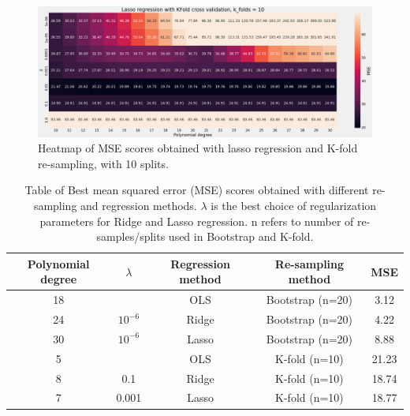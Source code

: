 \begin{figure}[H]
    \centering
    \includegraphics[width=\textwidth]{Figures/g_lasso_heatmap_kfold_n_10.png}
    \caption{Heatmap of MSE scores obtained with lasso regression and K-fold
    re-sampling, with 10 splits.}  
    \label{fig:g_lasso_boots_heatmap}  
\end{figure}



\begin{table}
    \centering
    \caption{Table of Best mean squared error (MSE) scores obtained with
        different re-sampling and regression
        methods. $\lambda $ is the best choice of regularization parameters for
        Ridge and Lasso regression. n refers to number of re-samples/splits used in
        Bootstrap and K-fold.}  
    \label{tab:terrain_mse_best} 
    \begin{tabular}{|c|c|c|c|c|}
        \hline
        Polynomial degree & $\lambda$ & Regression method & Re-sampling method & MSE \\
        \hline
                          18 &   &  OLS & Bootstrap (n=20) & 3.12\\
        \hline

                          24 & $10^{-6}$ &   Ridge & Bootstrap (n=20) & 4.22\\
        \hline

                          30 &  $10^{-6}$ & Lasso&  Bootstrap (n=20) & 8.88\\
        \hline

                          5 &  & OLS & K-fold (n=10)& 21.23\\
        \hline

                          8 &  0.1 & Ridge & K-fold (n=10)& 18.74\\ %
        \hline
                          7 & 0.001 &  Lasso & K-fold (n=10)& 18.77\\ %
        \hline
    \end{tabular} 
\end{table}




